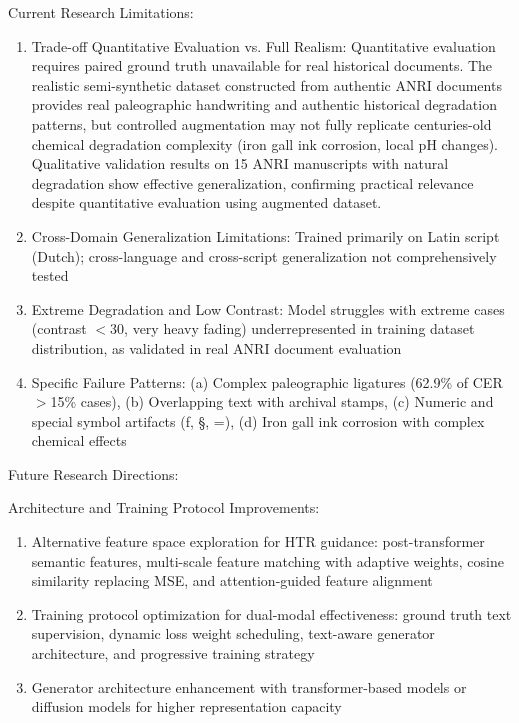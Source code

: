 \documentclass[journal]{IEEEtran}
\begin{document}
Current Research Limitations:
\begin{enumerate}
    \item Trade-off Quantitative Evaluation vs. Full Realism: Quantitative evaluation requires paired ground truth unavailable for real historical documents. The realistic semi-synthetic dataset constructed from authentic ANRI documents provides real paleographic handwriting and authentic historical degradation patterns, but controlled augmentation may not fully replicate centuries-old chemical degradation complexity (iron gall ink corrosion, local pH changes). Qualitative validation results on 15 ANRI manuscripts with natural degradation show effective generalization, confirming practical relevance despite quantitative evaluation using augmented dataset.
    \item Cross-Domain Generalization Limitations: Trained primarily on Latin script (Dutch); cross-language and cross-script generalization not comprehensively tested
    \item Extreme Degradation and Low Contrast: Model struggles with extreme cases (contrast $<$30, very heavy fading) underrepresented in training dataset distribution, as validated in real ANRI document evaluation
    \item Specific Failure Patterns: (a) Complex paleographic ligatures (62.9\% of CER$>$15\% cases), (b) Overlapping text with archival stamps, (c) Numeric and special symbol artifacts (ƒ, §, =), (d) Iron gall ink corrosion with complex chemical effects
\end{enumerate}

Future Research Directions:

Architecture and Training Protocol Improvements:
\begin{enumerate}
    \item Alternative feature space exploration for HTR guidance: post-transformer semantic features, multi-scale feature matching with adaptive weights, cosine similarity replacing MSE, and attention-guided feature alignment
    \item Training protocol optimization for dual-modal effectiveness: ground truth text supervision, dynamic loss weight scheduling, text-aware generator architecture, and progressive training strategy
    \item Generator architecture enhancement with transformer-based models or diffusion models for higher representation capacity
\end{enumerate}
\end{document}
